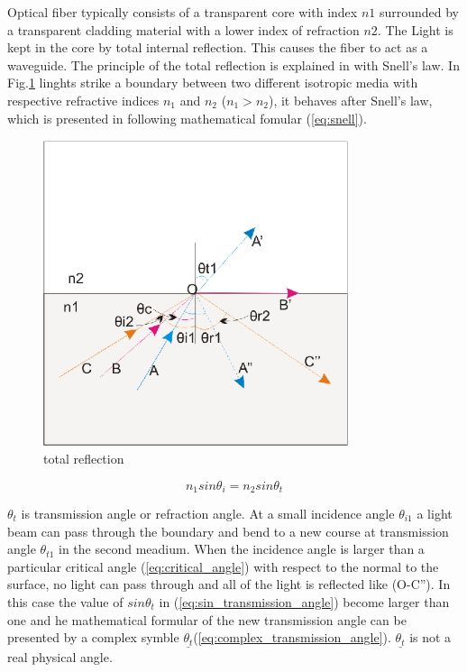 Optical fiber typically consists of a transparent core with index $n1$ surrounded by a transparent cladding material with a lower index of refraction $n2$. The Light is kept in the core by total internal reflection. This causes the fiber to act as a waveguide.
The principle of the total reflection is explained in \cite{script_FT_TET} with Snell's law. In Fig.\ref{fig:totalreflection} linghts strike a boundary between two different isotropic media with respective refractive indices $n_{1}$ and $n_{2}$ ($n_{1}>n_{2}$), it behaves after Snell's law, which is presented in following mathematical fomular (\ref{eq:snell}).
\begin{figure}[httbp]
\centering
\includegraphics[width=0.8\textwidth]{bilder/totalreflection}
\caption{total reflection}
\label{fig:totalreflection}
\end{figure}

\begin{equation}
n_{1}sin\theta_{i}=n_{2}sin\theta_{t}
\label{eq:snell}
\end{equation}

$\theta_{t}$ is transmission angle or refraction angle.
At a small incidence angle $\theta_{i1}$ a light beam can pass through the boundary and bend to a new course at transmission angle $\theta_{t1}$ in the second meadium.
When the incidence angle is larger than a particular critical angle (\ref{eq:critical_angle}) with respect to the normal to the surface, no light can pass through and all of the light is reflected like (O-C''). In this case the value of $sin\theta_{t}$ in (\ref{eq:sin_transmission_angle}) become larger than one and he mathematical formular of the new transmission angle can be presented by a complex symble $\underline{\theta_{t}}$(\ref{eq:complex_transmission_angle}). $\underline{\theta_{t}}$ is not a real physical angle.

